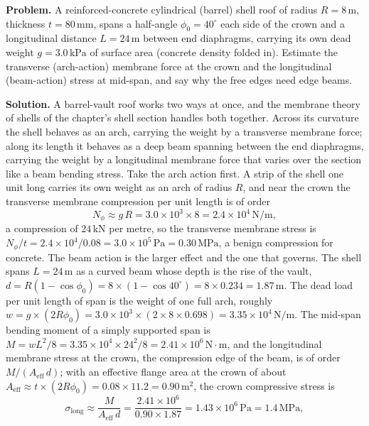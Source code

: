 

\textbf{Problem.} A reinforced-concrete cylindrical (barrel) shell roof of
radius $R = 8\,\si{\meter}$, thickness $t = 80\,\si{\milli\meter}$, spans a
half-angle $\phi_0 = 40^\circ$ each side of the crown and a longitudinal
distance $L = 24\,\si{\meter}$ between end diaphragms, carrying its own dead
weight $g = 3.0\,\text{kPa}$ of surface area (concrete density folded in).
Estimate the transverse (arch-action) membrane force at the crown and the
longitudinal (beam-action) stress at mid-span, and say why the free edges
need edge beams.

\textbf{Solution.} A barrel-vault roof works two ways at once, and the
membrane theory of shells of the chapter's shell section handles both
together. Across its curvature the shell behaves as an arch, carrying the
weight by a transverse membrane force; along its length it behaves as a deep
beam spanning between the end diaphragms, carrying the weight by a
longitudinal membrane force that varies over the section like a beam bending
stress. Take the arch action first. A strip of the shell one unit long carries
its own weight as an arch of radius $R$, and near the crown the transverse
membrane compression per unit length is of order
\[
N_\phi \approx g\,R = 3.0\times 10^3\times 8 = 2.4\times 10^{4}\,\text{N}/
\text{m},
\]
a compression of $24\,\text{kN}$ per metre, so the transverse membrane stress
is $N_\phi/t = 2.4\times 10^4/0.08 = 3.0\times 10^{5}\,\text{Pa} = 0.30\,
\text{MPa}$, a benign compression for concrete. The beam action is the larger
effect and the one that governs. The shell spans $L = 24\,\si{\meter}$ as a
curved beam whose depth is the rise of the vault, $d = R(1-\cos\phi_0) =
8\times(1-\cos 40^\circ) = 8\times 0.234 = 1.87\,\si{\meter}$. The dead load
per unit length of span is the weight of one full arch, roughly $w = g\times
(2 R \phi_0) = 3.0\times 10^3\times (2\times 8\times 0.698) = 3.35\times 10^4\,
\text{N}/\text{m}$. The mid-span bending moment of a simply supported span is
$M = w L^2/8 = 3.35\times 10^4\times 24^2/8 = 2.41\times 10^{6}\,\text{N}\cdot
\text{m}$, and the longitudinal membrane stress at the crown, the compression
edge of the beam, is of order $M/(A_{\text{eff}}\,d)$; with an effective flange
area at the crown of about $A_{\text{eff}} \approx t\times(2 R \phi_0) =
0.08\times 11.2 = 0.90\,\text{m}^2$, the crown compressive stress is
\[
\sigma_{\text{long}} \approx \frac{M}{A_{\text{eff}}\,d}
= \frac{2.41\times 10^6}{0.90\times 1.87}
= 1.43\times 10^{6}\,\text{Pa} = 1.4\,\text{MPa},
\]
